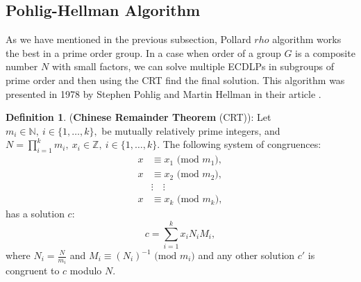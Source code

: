 \documentclass[thesis=M,english]{FITthesis}[2012/10/20]
\theoremstyle{remark}
\theoremstyle{definition}
\newtheorem{DF}{Definition}[section]
\begin{document}
\subsection{Pohlig-Hellman Algorithm}
As we have mentioned in the previous subsection, Pollard $rho$ algorithm works the best in a prime order group. In a case when order of a group $G$ is a composite number $N$ with small factors, we can solve multiple ECDLPs in subgroups of prime order and then using the CRT find the final solution. This algorithm was presented in 1978 by Stephen Pohlig and Martin Hellman in their article \cite{PH}. 
\begin{DF} (\textbf{Chinese Remainder Theorem} (CRT)): Let $m_i \in \mathbb{N},\ i \in \{1,\ldots, k\},$ be mutually relatively prime integers, and $N=\prod_{i=1}^k m_i,\ x_i \in \mathbb{Z},\ i \in \{1,\ldots, k\}.$ 
The following system of congruences:
\begin{align*}
x &\equiv x_1 \text{ (mod $m_1$)}, \\
x &\equiv x_2 \text{ (mod $m_2$)}, \\
&\vdots \quad \vdots \\
x &\equiv x_k \text{ (mod $m_k$)},
\end{align*}
has a solution $c$:
$$
c = \sum_{i=1}^k x_iN_iM_i,
$$ where $N_i=\frac{N}{m_i}$ and $M_i\equiv(N_i)^{-1} \text{ (mod $m_i$)}$ and any other solution $c'$ is congruent to $c$ modulo $N$.
\end{DF}
\end{document}
